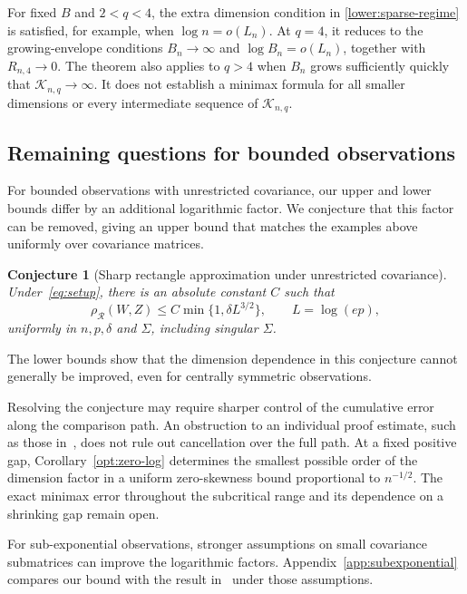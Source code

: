 \documentclass[11pt,letterpaper]{article}
\newtheorem{conjecture}{Conjecture}
\theoremstyle{remark}
\newcommand{\rh}{\rho_{\mathcal R}}
\begin{document}
For fixed \(B\) and \(2<q<4\), the extra dimension condition in
\eqref{lower:sparse-regime} is satisfied, for example, when
\(\log n=o(L_n)\). At \(q=4\), it reduces to the growing-envelope
conditions \(B_n\to\infty\) and \(\log B_n=o(L_n)\), together
with \(R_{n,4}\to0\). The theorem also applies to \(q>4\) when
\(B_n\) grows sufficiently quickly that \(\mathcal K_{n,q}\to\infty\).
It does not establish a minimax formula for all smaller dimensions
or every intermediate sequence of \(\mathcal K_{n,q}\).

\subsection{Remaining questions for bounded observations}

For bounded observations with unrestricted covariance, our upper and
lower bounds differ by an additional logarithmic factor. We conjecture
that this factor can be removed, giving an upper bound that matches
the examples above uniformly over covariance matrices.
\begin{conjecture}[Sharp rectangle approximation under unrestricted covariance]
\label{conj:sharp-unrestricted}
Under~\eqref{eq:setup}, there is an absolute constant \(C\) such that
\[
 \rh(W,Z)\le C\min\{1,\delta L^{3/2}\},\qquad L=\log(ep),
\]
uniformly in \(n,p,\delta\) and \(\Sigma\), including singular \(\Sigma\).
\end{conjecture}

The lower bounds show that the dimension dependence in this conjecture
cannot generally be improved, even for centrally symmetric observations.

Resolving the conjecture may require sharper control of the cumulative
error along the comparison path. An obstruction to an individual proof
estimate, such as those in~\cite{Obstruction}, does not rule out
cancellation over the full path. At a fixed positive gap, Corollary~\ref{opt:zero-log} determines
the smallest possible order of the dimension factor in a uniform
zero-skewness bound proportional to \(n^{-1/2}\). The exact minimax
error throughout the subcritical range and its dependence on a shrinking
gap remain open.

For sub-exponential observations, stronger assumptions on small
covariance submatrices can improve the logarithmic factors.
Appendix~\ref{app:subexponential} compares our bound with
the result in~\cite{Local} under those assumptions.
\end{document}
